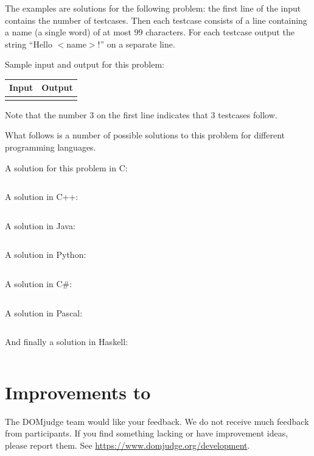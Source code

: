 The examples are solutions for the following problem: the first line
of the input contains the number of testcases. Then each testcase
consists of a line containing a name (a single word) of at most 99
characters. For each testcase output the string ``Hello $<$name$>$!''
on a separate line.

Sample input and output for this problem:

\begin{tabular}{|p{}|p{}|}
\hline
\textbf{Input} & \textbf{Output} \\
\hline
 &
 \\
\hline
\end{tabular}

Note that the number 3 on the first line indicates that 3 testcases
follow.

What follows is a number of possible solutions to this problem for different
programming languages.

A solution for this problem in C:
\inputminted{c}{../examples/example.c}

\newpage

A solution in C++:
\inputminted{cpp}{../examples/example.cc}

A solution in Java:
\inputminted{java}{../examples/example.java}

A solution in Python:
\inputminted{python}{../examples/example.py}

\newpage

A solution in C\#:
\inputminted{csharp}{../examples/example.cs}

A solution in Pascal:
\inputminted{pascal}{../examples/example.pas}

And finally a solution in Haskell:
\inputminted{haskell}{../examples/example.hs}

\section{Improvements to \DOMjudge}

The DOMjudge team would like your feedback. We do not receive much feedback
from participants. If you find something lacking or have improvement ideas,
please report them. See \url{https://www.domjudge.org/development}.


